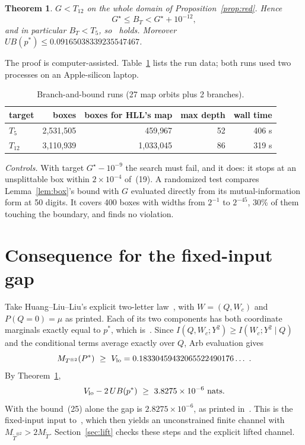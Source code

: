 \documentclass[11pt,draftclsnofoot,onecolumn,journal]{IEEEtran}
\newtheorem{theorem}{Theorem}
\begin{document}
\begin{theorem}\label{thm:main}
$G<T_{12}$ on the whole domain of Proposition~\ref{prop:red}. Hence
\[
G^\star\le B_T<G^\star+10^{-12},
\]
and in particular $B_T<T_5$, so~\cite[(25)]{HLL} holds. Moreover $UB(p^*)\le 0.09165038339235547467$.
\end{theorem}

The proof is computer-assisted. Table~\ref{tab:runs} lists the run data; both runs used two
processes on an Apple-silicon laptop.

\begin{table}[h]
\centering
\caption{Branch-and-bound runs (27 map orbits plus 2 branches).}\label{tab:runs}
\begin{tabular}{lrrrr}
\toprule
target & boxes & boxes for HLL's map & max depth & wall time\\
\midrule
$T_5$ & 2{,}531{,}505 & 459{,}967 & 52 & 406 s\\
$T_{12}$ & 3{,}110{,}939 & 1{,}033{,}045 & 86 & 319 s\\
\bottomrule
\end{tabular}
\end{table}

\emph{Controls.} With target $G^\star-10^{-9}$ the search must fail, and it does: it stops at an
unsplittable box within $2\times10^{-4}$ of~(19). A randomized test compares Lemma~\ref{lem:box}'s
bound with $G$ evaluated directly from its mutual-information form at 50 digits. It covers 400
boxes with widths from $2^{-1}$ to $2^{-45}$, 30\% of them touching the boundary, and finds no violation.

\section{Consequence for the fixed-input gap}

Take Huang--Liu--Liu's explicit two-letter law~\cite[App.~A]{HLL}, with $W=(Q,W_c)$ and $P(Q=0)=\mu$ as
printed. Each of its two components has both coordinate marginals exactly equal to $p^*$, which
is~\cite[(26)]{HLL}. Since $I(Q,W_c;Y^2)\ge I(W_c;Y^2\mid Q)$ and the conditional terms average
exactly over $Q$, Arb evaluation gives
\[
M_{T^{\otimes2}}(P^*)\ \ge\ V_{\rm lo}=0.18330459432065522490176\ldots\ .
\]
By Theorem~\ref{thm:main},
\[
V_{\rm lo}-2\,UB(p^*)\ \ge\ 3.8275\times10^{-6}\ \text{nats}.
\]
With the bound~(25) alone the gap is $2.8275\times10^{-6}$, as printed in~\cite{HLL}. This is the
fixed-input input to~\cite[Thm.~4]{HLL}, which then yields an unconstrained finite channel with
$M_{\tilde T^{\otimes2}}>2M_{\tilde T}$. Section~\ref{sec:lift} checks these steps and the explicit lifted channel.
\end{document}
